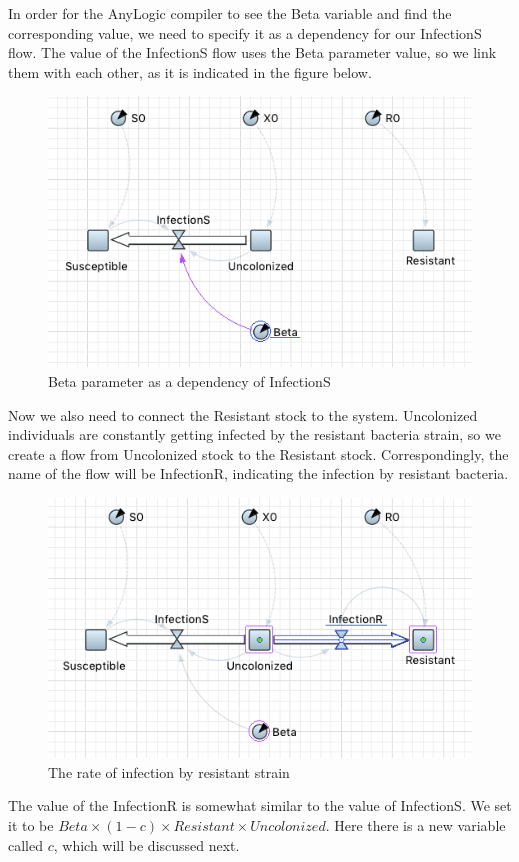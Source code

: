 In order for the AnyLogic compiler to see the Beta variable and find the corresponding value, we need to specify it as a dependency for our InfectionS flow. The value of the InfectionS flow uses the Beta parameter value, so we link them with each other, as it is indicated in the figure below.

\begin{figure}[H]
  \centering
  \includegraphics[height=0.5\textwidth]{img/screens/basic/basic15}
  \caption{Beta parameter as a dependency of InfectionS}
\end{figure}

Now we also need to connect the Resistant stock to the system. Uncolonized individuals are constantly getting infected by the resistant bacteria strain, so we create a flow from Uncolonized stock to the Resistant stock. Correspondingly, the name of the flow will be InfectionR, indicating the infection by resistant bacteria.

\begin{figure}[H]
  \centering
  \includegraphics[height=0.5\textwidth]{img/screens/basic/basic17}
  \caption{The rate of infection by resistant strain}
\end{figure}

The value of the InfectionR is somewhat similar to the value of InfectionS. We set it to be $Beta \times (1-c) \times Resistant \times Uncolonized$. Here there is a new variable called $c$, which will be discussed next.

